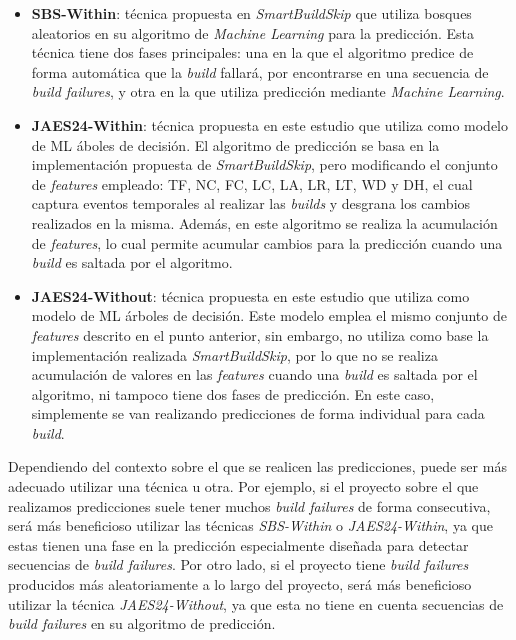 \begin{itemize}
    \item \textbf{SBS-Within}: técnica propuesta en \textit{SmartBuildSkip} que utiliza bosques
    aleatorios en su algoritmo de \textit{Machine Learning} para la predicción. Esta técnica
    tiene dos fases principales: una en la que el algoritmo predice de forma automática que
    la \textit{build} fallará, por encontrarse en una secuencia de \textit{build failures}, y
    otra en la que utiliza predicción mediante \textit{Machine Learning}.\\

    \item \textbf{JAES24-Within}: técnica propuesta en este estudio que utiliza como modelo de
    ML áboles de decisión. El algoritmo de predicción se basa en la implementación propuesta de
    \textit{SmartBuildSkip}, pero modificando el conjunto de \textit{features} empleado: TF, NC,
    FC, LC, LA, LR, LT, WD y DH, el cual captura eventos temporales al realizar las \textit{builds}
    y desgrana los cambios realizados en la misma. Además, en este algoritmo se realiza la
    acumulación de \textit{features}, lo cual permite acumular cambios para la predicción cuando
    una \textit{build} es saltada por el algoritmo.\\
    
    \item \textbf{JAES24-Without}: técnica propuesta en este estudio que utiliza como modelo de
    ML árboles de decisión. Este modelo emplea el mismo conjunto de \textit{features} descrito en
    el punto anterior, sin embargo, no utiliza como base la implementación realizada
    \textit{SmartBuildSkip}, por lo que no se realiza acumulación de valores en las \textit{features}
    cuando una \textit{build} es saltada por el algoritmo, ni tampoco tiene dos fases de predicción.
    En este caso, simplemente se van realizando predicciones de forma individual para cada
    \textit{build}.
\end{itemize}

Dependiendo del contexto sobre el que se realicen las predicciones, puede ser más adecuado
utilizar una técnica u otra. Por ejemplo, si el proyecto sobre el que realizamos predicciones
suele tener muchos \textit{build failures} de forma consecutiva, será más beneficioso utilizar
las técnicas \textit{SBS-Within} o \textit{JAES24-Within}, ya que estas tienen una fase
en la predicción especialmente diseñada para detectar secuencias de \textit{build failures}. Por
otro lado, si el proyecto tiene \textit{build failures} producidos más aleatoriamente a lo largo
del proyecto, será más beneficioso utilizar la técnica \textit{JAES24-Without}, ya que esta no 
tiene en cuenta secuencias de \textit{build failures} en su algoritmo de predicción.\\

